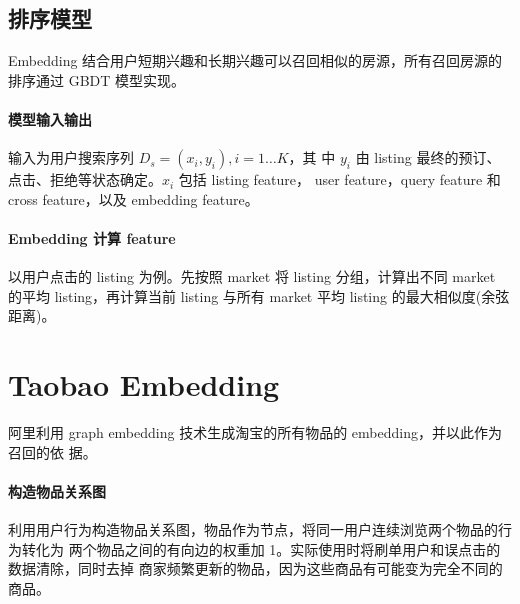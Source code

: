 \subsection{排序模型}
Embedding 结合用户短期兴趣和长期兴趣可以召回相似的房源，所有召回房源的排序通过
GBDT 模型实现。

\paragraph{模型输入输出} 输入为用户搜索序列 $D_s = (x_i, y_i), i=1 \ldots K$，其
中 $y_i$ 由 listing 最终的预订、点击、拒绝等状态确定。$x_i$ 包括 listing feature，
user feature，query feature 和 cross feature，以及 embedding feature。

\paragraph{Embedding 计算 feature} 以用户点击的 listing 为例。先按照 market 将
listing 分组，计算出不同 market 的平均 listing，再计算当前 listing 与所有 market
平均 listing 的最大相似度(余弦距离)。

\section{Taobao Embedding}
阿里利用 graph embedding 技术生成淘宝的所有物品的 embedding，并以此作为召回的依
据。

\paragraph{构造物品关系图}
利用用户行为构造物品关系图，物品作为节点，将同一用户连续浏览两个物品的行为转化为
两个物品之间的有向边的权重加 1。实际使用时将刷单用户和误点击的数据清除，同时去掉
商家频繁更新的物品，因为这些商品有可能变为完全不同的商品。

